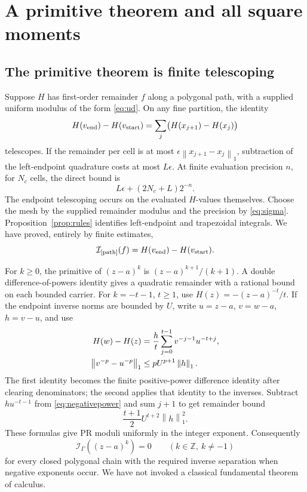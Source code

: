 \documentclass[11pt]{article}
\theoremstyle{definition}
\newcommand{\Z}{\mathbb Z}
\newcommand{\norm}[1]{\left\lVert#1\right\rVert_1}
\newcommand{\Int}{\mathcal I}
\begin{document}
\section{A primitive theorem and all square moments}\label{sec:moments}

\subsection{The primitive theorem is finite telescoping}

Suppose \(H\) has first-order remainder \(f\) along a polygonal path,
with a supplied uniform modulus of the form \eqref{eq:ud}. On any fine
partition, the identity
\[
 H(v_{\rm end})-H(v_{\rm start})
       =\sum_j\bigl(H(x_{j+1})-H(x_j)\bigr)
\]
telescopes. If the remainder per cell is at most
\(\epsilon\norm{x_{j+1}-x_j}\), subtraction of the left-endpoint
quadrature costs at most \(L\epsilon\). At finite evaluation precision
\(n\), for \(N_c\) cells, the direct bound is
\begin{equation}\label{eq:finiteprimitive}
 L\epsilon+(2N_c+L)2^{-n}.
\end{equation}
The endpoint telescoping occurs on the evaluated \(H\)-values themselves.
Choose the mesh by the supplied remainder modulus and the precision by
\eqref{eq:sigma}. Proposition~\ref{prop:rules} identifies left-endpoint
and trapezoidal integrals. We have proved, entirely by finite estimates,
\begin{equation}\label{eq:primitive}
 \Int_{[\text{path}]}(f)=H(v_{\rm end})-H(v_{\rm start}).
\end{equation}

For \(k\ge0\), the primitive of \((z-a)^k\) is
\((z-a)^{k+1}/(k+1)\). A double difference-of-powers identity gives a
quadratic remainder with a rational bound on each bounded carrier.
For \(k=-t-1\), \(t\ge1\), use
\(H(z)=-(z-a)^{-t}/t\). If the endpoint inverse norms are bounded by
\(U\), write \(u=z-a\), \(v=w-a\), \(h=v-u\), and use
\begin{align}
 H(w)-H(z)&=\frac h t
       \sum_{j=0}^{t-1}v^{-j-1}u^{-t+j},\label{eq:negativepower}\\
 \norm{v^{-p}-u^{-p}}&\le pU^{p+1}\norm h.\notag
\end{align}
The first identity becomes the finite positive-power difference identity
after clearing denominators; the second applies that identity to the
inverses. Subtract \(hu^{-t-1}\) from \eqref{eq:negativepower} and sum
\(j+1\) to get remainder bound
\begin{equation}\label{eq:negativeTaylor}
 \frac{t+1}{2}U^{t+2}\norm h^2.
\end{equation}
These formulas give PR moduli uniformly in the integer exponent.
Consequently
\begin{equation}\label{eq:ordinarymoments}
 \Int_\Gamma((z-a)^k)=0\qquad(k\in\Z,\ k\ne-1)
\end{equation}
for every closed polygonal chain with the required inverse separation
when negative exponents occur. We have not invoked a classical
fundamental theorem of calculus.
\end{document}

